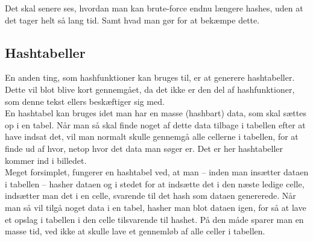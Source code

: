 Det skal senere ses, hvordan man kan brute-force endnu længere hashes, uden at det tager helt så lang tid.
Samt hvad man gør for at bekæmpe dette.

\subsection{Hashtabeller}
En anden ting, som hashfunktioner kan bruges til, er at generere hashtabeller.
Dette vil blot blive kort gennemgået, da det ikke er den del af hashfunktioner, som denne tekst ellers beskæftiger sig med.\\
En hashtabel kan bruges idet man har en masse (hashbart) data, som skal sættes op i en tabel.
Når man så skal finde noget af dette data tilbage i tabellen efter at have indsat det, vil man normalt skulle gennemgå alle cellerne i tabellen, for at finde ud af hvor, netop hvor det data man søger er. Det er her hashtabeller kommer ind i billedet.\\

Meget forsimplet, fungerer en hashtabel ved, at man -- inden man insætter dataen i tabellen -- hasher dataen og i stedet for at indsætte det i den næste ledige celle, indsætter man det i en celle, svarende til det hash som dataen genererede.
Når man så vil tilgå noget data i en tabel, hasher man blot dataen igen, for så at lave et opslag i tabellen i den celle tilsvarende til hashet. På den måde sparer man en masse tid, ved ikke at skulle lave et gennemløb af alle celler i tabellen.\cite{hashtables}
